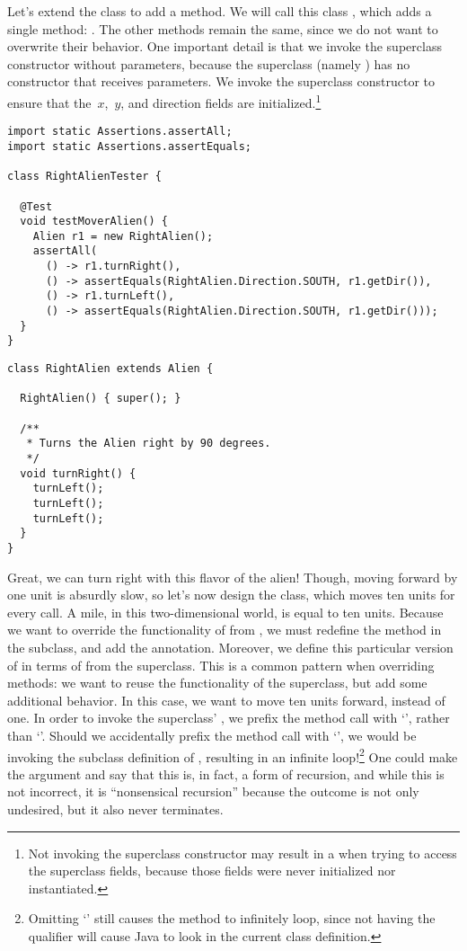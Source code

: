 Let's extend the  class to add a  method. 
We will call this class , which adds a single method: . 
The other methods remain the same, since we do not want to overwrite their behavior. 
One important detail is that we invoke the superclass constructor without parameters, because the superclass (namely ) has no constructor that receives parameters. 
We invoke the superclass constructor to ensure that the~$x$,~$y$, and direction fields are initialized.\footnote{Not invoking the superclass constructor may result in a  when trying to access the superclass fields, because those fields were never initialized nor instantiated.}

\begin{lstlisting}[language=MyJava]
import static Assertions.assertAll;
import static Assertions.assertEquals;

class RightAlienTester {

  @Test
  void testMoverAlien() {
    Alien r1 = new RightAlien();
    assertAll(
      () -> r1.turnRight(),
      () -> assertEquals(RightAlien.Direction.SOUTH, r1.getDir()),
      () -> r1.turnLeft(),
      () -> assertEquals(RightAlien.Direction.SOUTH, r1.getDir()));
  }
}
\end{lstlisting}

\enlargethispage{3\baselineskip}
\begin{lstlisting}[language=MyJava]
class RightAlien extends Alien {

  RightAlien() { super(); }

  /**
   * Turns the Alien right by 90 degrees.
   */
  void turnRight() {
    turnLeft();
    turnLeft();
    turnLeft();
  }
}
\end{lstlisting}

Great, we can turn right with this flavor of the alien! 
Though, moving forward by one unit is absurdly slow, so let's now design the  class, which moves ten units for every  call. 
A mile, in this two-dimensional world, is equal to ten units. 
Because we want to override the functionality of  from , we must redefine the method in the subclass, and add the  annotation. 
Moreover, we define this particular version of  in terms of  from the superclass. 
This is a common pattern when overriding methods: we want to reuse the functionality of the superclass, but add some additional behavior. 
In this case, we want to move ten units forward, instead of one. 
In order to invoke the superclass' , we prefix the method call with `', rather than `'. 
Should we accidentally prefix the method call with `', we would be invoking the subclass definition of , resulting in an infinite loop!\footnote{Omitting `' still causes the method to infinitely loop, since not having the qualifier will cause Java to look in the current class definition.} 
One could make the argument and say that this is, in fact, a form of recursion, and while this is not incorrect, it is ``nonsensical recursion'' because the outcome is not only undesired, but it also never terminates.

